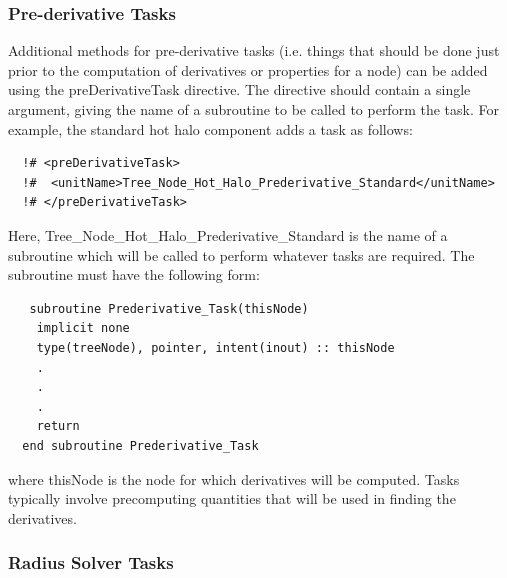 \subsubsection{Pre-derivative Tasks}

Additional methods for pre-derivative tasks (i.e. things that should be done just prior to the computation of derivatives or properties for a node) can be added using the {\normalfont \ttfamily preDerivativeTask} directive. The directive should contain a single argument, giving the name of a subroutine to be called to perform the task. For example, the standard hot halo component adds a task as follows:
\begin{verbatim}
  !# <preDerivativeTask>
  !#  <unitName>Tree_Node_Hot_Halo_Prederivative_Standard</unitName>
  !# </preDerivativeTask>
\end{verbatim}
Here, {\normalfont \ttfamily Tree\_Node\_Hot\_Halo\_Prederivative\_Standard} is the name of a subroutine which will be called to perform whatever tasks are required. The subroutine must have the following form:
\begin{verbatim}
   subroutine Prederivative_Task(thisNode)
    implicit none
    type(treeNode), pointer, intent(inout) :: thisNode
    .
    .
    .
    return
  end subroutine Prederivative_Task
\end{verbatim}
where {\normalfont \ttfamily thisNode} is the node for which derivatives will be computed. Tasks typically involve precomputing quantities that will be used in finding the derivatives.

\subsubsection{Radius Solver Tasks}\label{sec:radius_solver}

